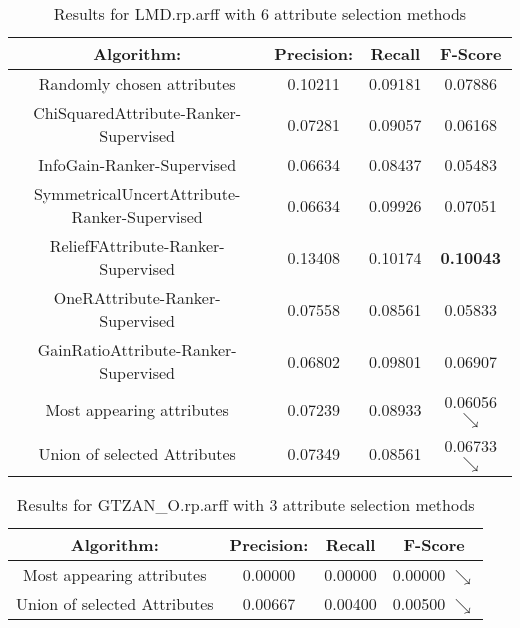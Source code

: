 \begin{table}[p]
\begin{center}
\begin{tabular}{|c|c|c|c|}
\hline Algorithm: & Precision: & Recall & F-Score\\
\hline Randomly chosen attributes & 0.10211 & 0.09181 & 0.07886\\
\hline ChiSquaredAttribute-Ranker-Supervised & 0.07281 & 0.09057 & 0.06168\\
\hline InfoGain-Ranker-Supervised & 0.06634 & 0.08437 & 0.05483\\
\hline SymmetricalUncertAttribute-Ranker-Supervised & 0.06634 & 0.09926 &
0.07051\\
\hline ReliefFAttribute-Ranker-Supervised & 0.13408 & 0.10174 & {\bf 0.10043}\\
\hline OneRAttribute-Ranker-Supervised & 0.07558 & 0.08561 & 0.05833\\
\hline GainRatioAttribute-Ranker-Supervised & 0.06802 & 0.09801 & 0.06907\\
\hline Most appearing attributes & 0.07239 & 0.08933 & 0.06056 $\searrow$\\
\hline Union of selected Attributes & 0.07349 & 0.08561 & 0.06733 $\searrow$\\

\hline
\end{tabular}
\caption{Results for LMD.rp.arff with 6 attribute selection methods}
\label{table:classifier:LMD6}
\end{center}
\end{table}





\begin{table}[p]
\begin{center}
\begin{tabular}{|c|c|c|c|}
\hline Algorithm: & Precision: & Recall & F-Score\\
\hline Most appearing attributes & 0.00000 & 0.00000 & 0.00000 $\searrow$\\
\hline Union of selected Attributes & 0.00667 & 0.00400 & 0.00500 $\searrow$\\

\hline
\end{tabular}
\caption{Results for GTZAN\_O.rp.arff with 3 attribute selection methods}
\label{table:classifier:GTZANO3}
\end{center}
\end{table}


